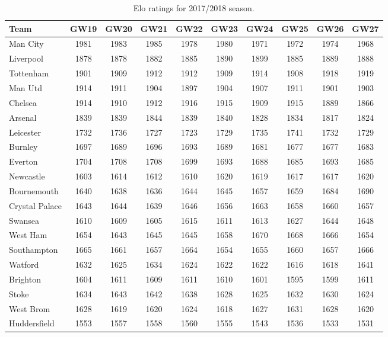 \begin{table}[H]
\centering
\smaller
\begin{tabular}{|l|c|c|c|c|c|c|c|c|c|}
\hline
Team           & GW19 & GW20 & GW21 & GW22 & GW23 & GW24 & GW25 & GW26 & GW27 \\
\hline
Man City  \Tstrut     & 1981 & 1983 & 1985 & 1978 & 1980 & 1971 & 1972 & 1974 & 1968 \\
Liverpool      & 1878 & 1878 & 1882 & 1885 & 1890 & 1899 & 1885 & 1889 & 1888 \\
Tottenham      & 1901 & 1909 & 1912 & 1912 & 1909 & 1914 & 1908 & 1918 & 1919 \\
Man Utd        & 1914 & 1911 & 1904 & 1897 & 1904 & 1907 & 1911 & 1901 & 1903 \\
Chelsea        & 1914 & 1910 & 1912 & 1916 & 1915 & 1909 & 1915 & 1889 & 1866 \\
Arsenal        & 1839 & 1839 & 1844 & 1839 & 1840 & 1828 & 1834 & 1817 & 1824 \\
Leicester      & 1732 & 1736 & 1727 & 1723 & 1729 & 1735 & 1741 & 1732 & 1729 \\
Burnley        & 1697 & 1689 & 1696 & 1693 & 1689 & 1681 & 1677 & 1677 & 1683 \\
Everton        & 1704 & 1708 & 1708 & 1699 & 1693 & 1688 & 1685 & 1693 & 1685 \\
Newcastle      & 1603 & 1614 & 1612 & 1610 & 1620 & 1619 & 1617 & 1617 & 1620 \\
Bournemouth    & 1640 & 1638 & 1636 & 1644 & 1645 & 1657 & 1659 & 1684 & 1690 \\
Crystal Palace & 1643 & 1644 & 1639 & 1646 & 1656 & 1663 & 1658 & 1660 & 1657 \\
Swansea        & 1610 & 1609 & 1605 & 1615 & 1611 & 1613 & 1627 & 1644 & 1648 \\
West Ham       & 1654 & 1643 & 1645 & 1645 & 1658 & 1670 & 1668 & 1666 & 1654 \\
Southampton    & 1665 & 1661 & 1657 & 1664 & 1654 & 1655 & 1660 & 1657 & 1666 \\
Watford        & 1632 & 1625 & 1634 & 1624 & 1622 & 1622 & 1616 & 1618 & 1641 \\
Brighton       & 1604 & 1611 & 1609 & 1611 & 1610 & 1601 & 1595 & 1599 & 1611 \\
Stoke          & 1634 & 1643 & 1642 & 1638 & 1628 & 1625 & 1632 & 1630 & 1624 \\
West Brom      & 1628 & 1619 & 1620 & 1624 & 1618 & 1627 & 1631 & 1628 & 1620 \\
Huddersfield  \Bstrut & 1553 & 1557 & 1558 & 1560 & 1555 & 1543 & 1536 & 1533 & 1531 \\
\hline
\end{tabular}
\caption{Elo ratings for 2017/2018 season.}
\label{tab:elo_values_gameweeks_3}
\end{table}


